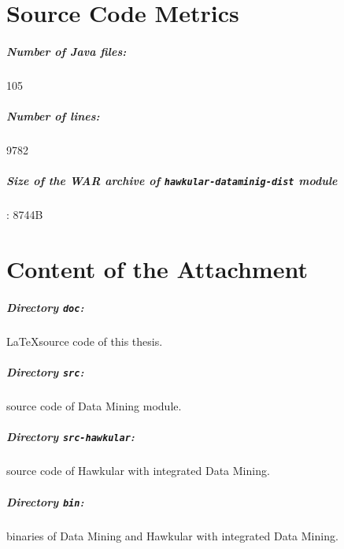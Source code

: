 \chapter{Source Code Metrics}
    \paragraph*{Number of Java files:} 105
    \paragraph*{Number of lines:} 9782
    \paragraph*{Size of the WAR archive of \texttt{hawkular-dataminig-dist} module} : 8744B

\chapter{Content of the Attachment}
    \paragraph*{Directory \texttt{doc}:} \LaTeX source code of this thesis.
    \paragraph*{Directory \texttt{src}:} source code of Data Mining module.
    \paragraph*{Directory \texttt{src-hawkular}:} source code of Hawkular with integrated Data Mining.
    \paragraph*{Directory \texttt{bin}:} binaries of Data Mining and Hawkular with integrated Data Mining.
